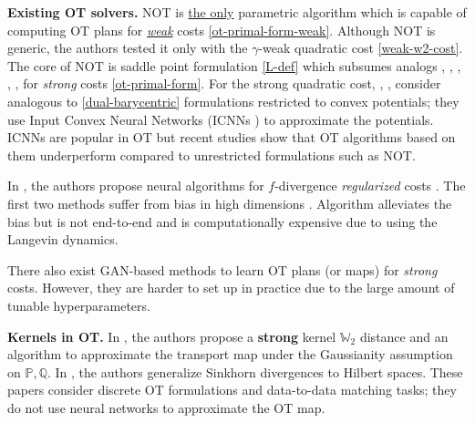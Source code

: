 \documentclass{article} %
\begin{document}
\textbf{Existing OT solvers.} NOT \citep{korotin2023neural} is \underline{the only} parametric algorithm which is capable of computing OT plans for \underline{\textit{weak}} costs \eqref{ot-primal-form-weak}. Although NOT is generic, the authors tested it only with the $\gamma$-weak quadratic cost \eqref{weak-w2-cost}. The core of NOT is saddle point formulation \eqref{L-def} which subsumes analogs \citep[Eq. 9]{korotin2021neural}, \citep[Eq. 14]{rout2022generative}, \citep[Eq. 11]{fan2022scalable}, \citep[Eq. 11]{henry2019martingale}, \citep[Eq. 10]{gazdieva2022optimal}, \citep[Eq. 7]{korotin2022wasserstein} for \textit{strong} costs \eqref{ot-primal-form}. For the strong quadratic cost, \citep{makkuva2020optimal}, \citep[Eq. 2.2]{taghvaei20192}, \citep[Eq. 10]{korotin2021wasserstein} consider analogous to \eqref{dual-barycentric} formulations restricted to convex potentials; they use Input Convex Neural Networks (ICNNs \citep{amos2017input}) to approximate the potentials. ICNNs are popular in OT \citep{korotin2021continuous,mokrov2021large,huang2020convex,alvarez-melis2022optimizing,bunne2022proximal} but recent studies \citep{korotin2021neural,korotin2022wasserstein,fan2022variational} show that OT algorithms based on them underperform compared to unrestricted formulations such as NOT.

In \citep{genevay2016stochastic,seguy2018large,daniels2021score}, the authors propose neural algorithms for $f$-divergence \textit{regularized} costs \citep{genevay2019entropy}. The first two methods suffer from bias in high dimensions \citep[]{korotin2021neural}.
Algorithm \citep{daniels2021score} alleviates the bias but is not end-to-end and is computationally expensive due to using the Langevin dynamics.

\vspace{-1mm}There also exist GAN-based \citep{goodfellow2014generative} methods
\citep{lu2020large,xie2019scalable,gonzalez2022gan} to learn OT plans (or maps) for \textit{strong} costs. However, they are harder to set up in practice due to the large amount of tunable hyperparameters.

\textbf{Kernels in OT.} In \citep{zhang2019optimal,oh2020novel}, the authors propose a \textbf{strong} kernel $\mathbb{W}_{2}$ distance and an algorithm to approximate the transport map under the Gaussianity assumption on $\mathbb{P},\mathbb{Q}$. In \citep{li2021hilbert}, the authors generalize Sinkhorn divergences \citep{genevay2019sample} to Hilbert spaces. These papers consider discrete OT formulations and data-to-data matching tasks; they do not use neural networks to approximate the OT map.
\end{document}
